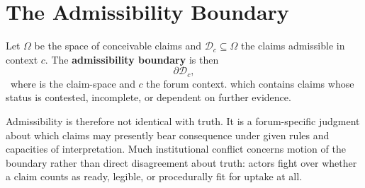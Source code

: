 
\chapter{The Admissibility Boundary}
\label{ch:ch050}

Let \(\Omega\) be the space of conceivable claims and \(\mathcal D_c\subseteq\Omega\) the claims admissible in context \(c\). The \textbf{admissibility boundary} is then
\[
\partial\mathcal D_c,
\]
\Definition\ where \Omega is the claim-space and \(c\) the forum context.
which contains claims whose status is contested, incomplete, or dependent on further evidence.

Admissibility is therefore not identical with truth. It is a forum-specific judgment about which claims may presently bear consequence under given rules and capacities of interpretation. Much institutional conflict concerns motion of the boundary rather than direct disagreement about truth: actors fight over whether a claim counts as ready, legible, or procedurally fit for uptake at all.
